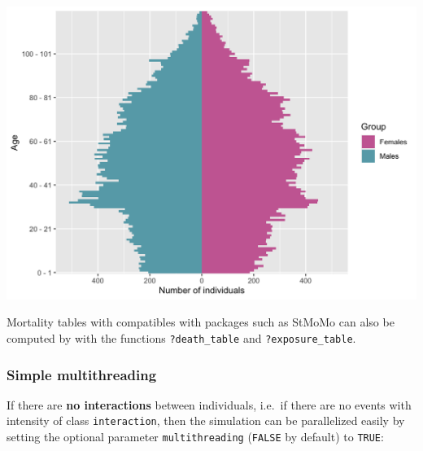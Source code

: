 \begin{center}\includegraphics{figure/main_plot_30-1} \end{center}

Mortality tables with compatibles with packages such as StMoMo can also be computed by with the functions \texttt{?death\_table} and \texttt{?exposure\_table}.

\begin{Shaded}
\begin{Highlighting}[]
\StringTok{ }\NormalTok{pop\_out[pop\_out}\OperatorTok{$}\OperatorTok{==}\NormalTok{, ]}
\StringTok{ } \OperatorTok{:}\NormalTok{, } \OperatorTok{:}\NormalTok{)    }
\StringTok{ } \OperatorTok{:}\NormalTok{, } \OperatorTok{:}\NormalTok{)}
\end{Highlighting}
\end{Shaded}

\hypertarget{simple-multithreading}{%
\subsubsection{Simple multithreading}\label{simple-multithreading}}

If there are \textbf{no interactions} between individuals, i.e.~if there are no events with intensity of class \texttt{interaction}, then the simulation can be parallelized easily by setting the optional parameter \texttt{multithreading} (\texttt{FALSE} by default) to \texttt{TRUE}:

